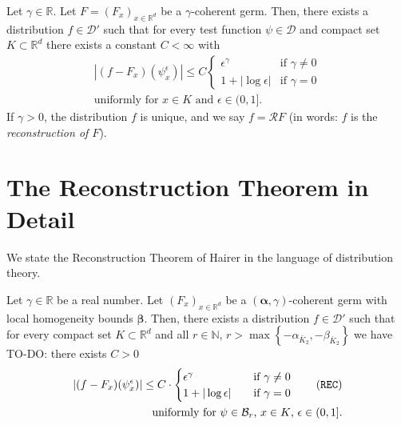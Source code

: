\begin{theorem}\label{peek:prelim-reconstruction-theorem}
    Let $\gamma \in \mathbb{R}$.
   Let $F = (F_x)_{x \in \mathbb{R}^d}$ be a $\gamma$-coherent germ. Then, there exists a distribution $f \in \mathcal{D}'$ such that for every test function $\psi \in \mathcal{D}$ and compact set $K \subset \mathbb{R}^d$ there exists a constant $C < \infty$ with  
   \begin{gather*}
           |(f-F_x)(\psi^\epsilon_x)| \leq C \begin{cases}
                   \epsilon^\gamma \quad &\text{if $\gamma \neq 0$} \\
                   1+|\log\epsilon| & \text{if $\gamma = 0$}
           \end{cases} \\ \text{uniformly for $x \in K$ and $\epsilon \in (0,1]$}.
   \end{gather*}
   If $\gamma > 0$, the distribution $f$ is unique, and we say $f = \mathcal{R}F$ (in words: $f$ is the \emph{reconstruction of $F$}).
\end{theorem}






\section{The Reconstruction Theorem in Detail}

We state the Reconstruction Theorem of Hairer \cite{hairer2014theory} in the language of {distribution theory}.

\begin{theorem}\label{theorem:reconstruction-theorem}
   Let $\gamma \in \mathbb{R}$ be a real number. Let $(F_x)_{x \in \mathbb{R}^d}$ be a $(\bm{\alpha}, \gamma)$-coherent germ with local homogeneity bounds $\bm \beta$. Then, there exists a distribution $f \in \mathcal{D}'$ such that for every compact set $K \subset \mathbb{R}^d$ and all $r \in \mathbb{N}$, $r> \max \left\{ -\alpha_{\bar K_2}, -\beta_{\bar K_2} \right\}$ we have TO-DO: there exists $C > 0$ 
   \begin{align*}\label{reconstruction-theorem}
        |(f-F_x)(\psi^\epsilon_x)| \leq C \cdot \begin{cases}
            \epsilon^\gamma \quad & \text{if $\gamma \neq 0$}\\
            1 + |\log \epsilon| \quad & \text{if $\gamma = 0$}
        \end{cases}\tag{\texttt{REC}}
        \\ \text{uniformly for $\psi \in \mathcal{B}_r$, $x \in K$, $\epsilon \in (0,1]$.} 
   \end{align*}
\end{theorem}

